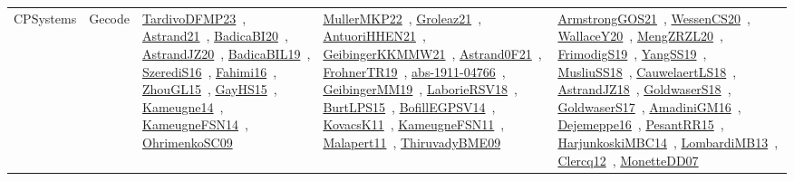 {\begin{longtable}{lp{3cm}>{\raggedright\arraybackslash}p{6cm}>{\raggedright\arraybackslash}p{6cm}>{\raggedright\arraybackslash}p{8cm}}
CPSystems & Gecode & \href{works/TardivoDFMP23.pdf}{TardivoDFMP23}~\cite{TardivoDFMP23}, \href{works/Astrand21.pdf}{Astrand21}~\cite{Astrand21}, \href{works/BadicaBI20.pdf}{BadicaBI20}~\cite{BadicaBI20}, \href{works/AstrandJZ20.pdf}{AstrandJZ20}~\cite{AstrandJZ20}, \href{works/BadicaBIL19.pdf}{BadicaBIL19}~\cite{BadicaBIL19}, \href{works/SzerediS16.pdf}{SzerediS16}~\cite{SzerediS16}, \href{works/Fahimi16.pdf}{Fahimi16}~\cite{Fahimi16}, \href{works/ZhouGL15.pdf}{ZhouGL15}~\cite{ZhouGL15}, \href{works/GayHS15.pdf}{GayHS15}~\cite{GayHS15}, \href{works/Kameugne14.pdf}{Kameugne14}~\cite{Kameugne14}, \href{works/KameugneFSN14.pdf}{KameugneFSN14}~\cite{KameugneFSN14}, \href{works/OhrimenkoSC09.pdf}{OhrimenkoSC09}~\cite{OhrimenkoSC09} & \href{works/MullerMKP22.pdf}{MullerMKP22}~\cite{MullerMKP22}, \href{works/Groleaz21.pdf}{Groleaz21}~\cite{Groleaz21}, \href{works/AntuoriHHEN21.pdf}{AntuoriHHEN21}~\cite{AntuoriHHEN21}, \href{works/GeibingerKKMMW21.pdf}{GeibingerKKMMW21}~\cite{GeibingerKKMMW21}, \href{works/Astrand0F21.pdf}{Astrand0F21}~\cite{Astrand0F21}, \href{works/FrohnerTR19.pdf}{FrohnerTR19}~\cite{FrohnerTR19}, \href{works/abs-1911-04766.pdf}{abs-1911-04766}~\cite{abs-1911-04766}, \href{works/GeibingerMM19.pdf}{GeibingerMM19}~\cite{GeibingerMM19}, \href{works/LaborieRSV18.pdf}{LaborieRSV18}~\cite{LaborieRSV18}, \href{works/BurtLPS15.pdf}{BurtLPS15}~\cite{BurtLPS15}, \href{works/BofillEGPSV14.pdf}{BofillEGPSV14}~\cite{BofillEGPSV14}, \href{works/KovacsK11.pdf}{KovacsK11}~\cite{KovacsK11}, \href{works/KameugneFSN11.pdf}{KameugneFSN11}~\cite{KameugneFSN11}, \href{works/Malapert11.pdf}{Malapert11}~\cite{Malapert11}, \href{works/ThiruvadyBME09.pdf}{ThiruvadyBME09}~\cite{ThiruvadyBME09} & \href{works/ArmstrongGOS21.pdf}{ArmstrongGOS21}~\cite{ArmstrongGOS21}, \href{works/WessenCS20.pdf}{WessenCS20}~\cite{WessenCS20}, \href{works/WallaceY20.pdf}{WallaceY20}~\cite{WallaceY20}, \href{works/MengZRZL20.pdf}{MengZRZL20}~\cite{MengZRZL20}, \href{works/FrimodigS19.pdf}{FrimodigS19}~\cite{FrimodigS19}, \href{works/YangSS19.pdf}{YangSS19}~\cite{YangSS19}, \href{works/MusliuSS18.pdf}{MusliuSS18}~\cite{MusliuSS18}, \href{works/CauwelaertLS18.pdf}{CauwelaertLS18}~\cite{CauwelaertLS18}, \href{works/AstrandJZ18.pdf}{AstrandJZ18}~\cite{AstrandJZ18}, \href{works/GoldwaserS18.pdf}{GoldwaserS18}~\cite{GoldwaserS18}, \href{works/GoldwaserS17.pdf}{GoldwaserS17}~\cite{GoldwaserS17}, \href{works/AmadiniGM16.pdf}{AmadiniGM16}~\cite{AmadiniGM16}, \href{works/Dejemeppe16.pdf}{Dejemeppe16}~\cite{Dejemeppe16}, \href{works/PesantRR15.pdf}{PesantRR15}~\cite{PesantRR15}, \href{works/HarjunkoskiMBC14.pdf}{HarjunkoskiMBC14}~\cite{HarjunkoskiMBC14}, \href{works/LombardiMB13.pdf}{LombardiMB13}~\cite{LombardiMB13}, \href{works/Clercq12.pdf}{Clercq12}~\cite{Clercq12}, \href{works/MonetteDD07.pdf}{MonetteDD07}~\cite{MonetteDD07}\\

\end{longtable}}
